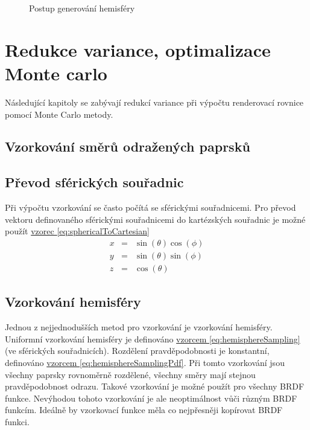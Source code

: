 \documentclass[czech,master,dept460,male,cpp,cpdeclaration]{diploma}
\begin{document}
\begin{figure}[ht]
    \qquad
    \caption{Postup generování hemisféry}%
    \label{fig:hemisfera}%
\end{figure}


\clearpage
\section{Redukce variance, optimalizace Monte carlo}
Následující kapitoly se zabývají redukcí variance při výpočtu renderovací rovnice pomocí Monte Carlo metody.
\subsection{Vzorkování směrů odražených paprsků}
\subsection{Převod sférických souřadnic}
Při výpočtu vzorkování se často počítá se sférickými souřadnicemi. Pro převod vektoru definovaného sférickými souřadnicemi do kartézských souřadnic je možné použít \hyperref[eq:sphericalToCartesian]{vzorec \ref{eq:sphericalToCartesian}}
\begin{eqnarray}
    x & = & \sin(\theta)\cos(\phi)\nonumber \\
    y & = & \sin(\theta)\sin(\phi)\nonumber \\
    z & = & \cos(\theta)\label{eq:sphericalToCartesian}
\end{eqnarray}

\subsection{Vzorkování hemisféry} \label{sec:hemisphere}
Jednou z nejjednodušších metod pro vzorkování je vzorkování hemisféry. Uniformní vzorkování hemisféry je definováno \hyperref[eq:hemisphereSampling]{vzorcem \ref{eq:hemisphereSampling}} (ve sférických souřadnicích). Rozdělení pravděpodobnosti je konstantní, definováno \hyperref[eq:hemisphereSamplingPdf]{vzorcem \ref{eq:hemisphereSamplingPdf}}. Při tomto vzorkování jsou všechny paprsky rovnoměrně rozdělené, všechny směry mají stejnou pravděpodobnost odrazu. Takové vzorkování je možné použít pro všechny BRDF funkce. Nevýhodou tohoto vzorkování je ale neoptimálnost vůči různým BRDF funkcím. Ideálně by vzorkovací funkce měla co nejpřesněji kopírovat BRDF funkci. \par
\end{document}
